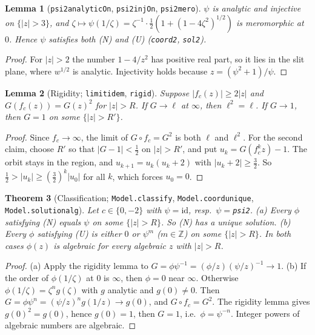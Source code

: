\documentclass[11pt]{article}
\newtheorem{theorem}{Theorem}
\newtheorem{lemma}[theorem]{Lemma}
\theoremstyle{definition}
\theoremstyle{remark}
\renewcommand{\_}{\oldus\allowbreak}
\begin{document}
\begin{lemma}[\texttt{psi2\_analyticOn}, \texttt{psi2\_injOn}, \texttt{psi2\_mero}]
$\psi$ is analytic and injective on $\{|z|>3\}$, and $\zeta\mapsto\psi(1/\zeta)=\zeta^{-1}\cdot\frac12
(1+(1-4\zeta^2)^{1/2})$ is meromorphic at $0$. Hence $\psi$ satisfies both (N) and (U)
(\texttt{coord2}, \texttt{sol2}).
\end{lemma}
\begin{proof}
For $|z|>2$ the number $1-4/z^2$ has positive real part, so it lies in the slit plane, where $w^{1/2}$ is
analytic. Injectivity holds because $z=(\psi^2+1)/\psi$.
\end{proof}

\begin{lemma}[Rigidity; \texttt{limit\_idem}, \texttt{rigid}]
Suppose $|f_c(z)|\ge2|z|$ and $G(f_c(z))=G(z)^2$ for $|z|>R$. If $G\to\ell$ at $\infty$, then
$\ell^2=\ell$. If $G\to1$, then $G=1$ on some $\{|z|>R'\}$.
\end{lemma}
\begin{proof}
Since $f_c\to\infty$, the limit of $G\circ f_c=G^2$ is both $\ell$ and $\ell^2$. For the second claim,
choose $R'$ so that $|G-1|<\frac12$ on $|z|>R'$, and put $u_k=G(f_c^k z)-1$. The orbit stays in the
region, and $u_{k+1}=u_k(u_k+2)$ with $|u_k+2|\ge\frac32$. So $\frac12>|u_k|\ge(\frac32)^k|u_0|$ for all
$k$, which forces $u_0=0$.
\end{proof}

\begin{theorem}[Classification; \texttt{Model.classify}, \texttt{Model.coord\_unique},
\texttt{Model.solution\_alg}]
Let $c\in\{0,-2\}$ with $\psi=\mathrm{id}$, resp.\ $\psi=$\texttt{psi2}.
(a) Every $\phi$ satisfying (N) equals $\psi$ on some $\{|z|>R\}$. So (N) has a unique solution.
(b) Every $\phi$ satisfying (U) is either $0$ or $\psi^{m}$ ($m\in\mathbb{Z}$) on some $\{|z|>R\}$.
In both cases $\phi(z)$ is algebraic for every algebraic $z$ with $|z|>R$.
\end{theorem}
\begin{proof}
(a) Apply the rigidity lemma to $G=\phi\psi^{-1}=(\phi/z)(\psi/z)^{-1}\to1$. (b) If the order of
$\phi(1/\zeta)$ at $0$ is $\infty$, then $\phi=0$ near $\infty$. Otherwise
$\phi(1/\zeta)=\zeta^n g(\zeta)$ with $g$ analytic and $g(0)\ne0$. Then
$G=\phi\psi^n=(\psi/z)^n g(1/z)\to g(0)$, and $G\circ f_c=G^2$. The rigidity lemma gives $g(0)^2=g(0)$,
hence $g(0)=1$, then $G=1$, i.e.\ $\phi=\psi^{-n}$. Integer powers of algebraic numbers are algebraic.
\end{proof}
\end{document}
